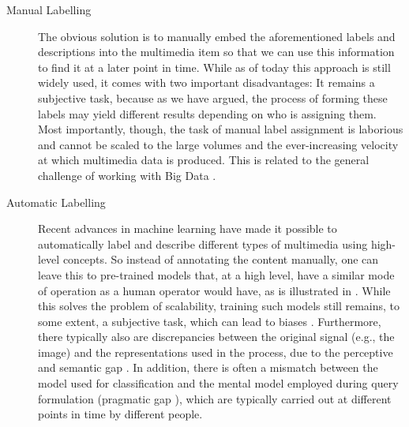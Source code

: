 \begin{description}
    \item[Manual Labelling] The obvious solution is to manually embed the aforementioned labels and descriptions into the multimedia item so that we can use this information to find it at a later point in time. While as of today this approach is still widely used, it comes with two important disadvantages: It remains a subjective task, because as we have argued, the process of forming these labels may yield different results depending on who is assigning them. Most importantly, though, the task of manual label assignment is laborious and cannot be scaled to the large volumes and the ever-increasing velocity at which multimedia data is produced. This is related to the general challenge of working with Big Data \cite{Khan:2014Seven}.
    \item[Automatic Labelling] Recent advances in machine learning have made it possible to automatically label \cite{Redmon:2016You} and describe \cite{Radford:2021Learning} different types of multimedia using high-level concepts. So instead of annotating the content manually, one can leave this to pre-trained models that, at a high level, have a similar mode of operation as a human operator would have, as is illustrated in . While this solves the problem of scalability, training such models still remains, to some extent, a subjective task, which can lead to biases \cite{Baer2017:Controlling}. Furthermore, there typically also are discrepancies between the original signal (e.g., the image) and the representations used in the process, due to the perceptive \cite{Rossetto:2018Multi} and semantic gap \cite{Zezula:2006Similarity}. In addition, there is often a mismatch between the model used for classification and the mental model employed during query formulation (pragmatic gap \cite{Zahalka:2014Towards}), which are typically carried out at different points in time by different people.

\end{description}
